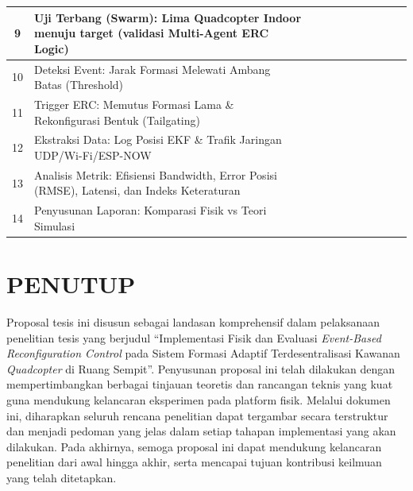 \documentclass[12pt,a4paper]{report}
\numberwithin{equation}{chapter}
\begin{document}
\begin{table}[htbp]
{\begin{tabular}{|c|p{11.5cm}|c|c|c|c|c|c|c|c|c|}
        9 & Uji Terbang (Swarm): Lima Quadcopter Indoor menuju target (validasi Multi-Agent ERC Logic) & & & & & \cellcolor{gray!70} & \cellcolor{gray!70} & \cellcolor{gray!70} & \cellcolor{gray!70} & \\ \hline
        10 & Deteksi Event: Jarak Formasi Melewati Ambang Batas (Threshold) & & & & & \cellcolor{gray!70} & \cellcolor{gray!70} & \cellcolor{gray!70} & \cellcolor{gray!70} & \\ \hline
        11 & Trigger ERC: Memutus Formasi Lama \& Rekonfigurasi Bentuk (Tailgating) & & & & & \cellcolor{gray!70} & \cellcolor{gray!70} & \cellcolor{gray!70} & \cellcolor{gray!70} & \\ \hline
        12 & Ekstraksi Data: Log Posisi EKF \& Trafik Jaringan UDP/Wi-Fi/ESP-NOW & & & & & & & & & \cellcolor{gray!70} \\ \hline
        13 & Analisis Metrik: Efisiensi Bandwidth, Error Posisi (RMSE\label{abbr:rmse}), Latensi, dan Indeks Keteraturan & & & & & & & & & \cellcolor{gray!70} \\ \hline
        14 & Penyusunan Laporan: Komparasi Fisik vs Teori Simulasi & & & & & & & & & \cellcolor{gray!70} \\ \hline
    \end{tabular}%
    }
\end{table}

\chapter{PENUTUP}
Proposal tesis ini disusun sebagai landasan komprehensif dalam pelaksanaan penelitian tesis yang berjudul ``Implementasi Fisik dan Evaluasi \textit{Event-Based Reconfiguration Control} pada Sistem Formasi Adaptif Terdesentralisasi Kawanan \textit{Quadcopter} di Ruang Sempit''. Penyusunan proposal ini telah dilakukan dengan mempertimbangkan berbagai tinjauan teoretis dan rancangan teknis yang kuat guna mendukung kelancaran eksperimen pada platform fisik. Melalui dokumen ini, diharapkan seluruh rencana penelitian dapat tergambar secara terstruktur dan menjadi pedoman yang jelas dalam setiap tahapan implementasi yang akan dilakukan. Pada akhirnya, semoga proposal ini dapat mendukung kelancaran penelitian dari awal hingga akhir, serta mencapai tujuan kontribusi keilmuan yang telah ditetapkan.

\clearpage
\renewcommand{\bibname}{DAFTAR PUSTAKA} %




\end{document}

